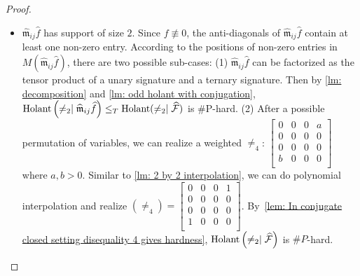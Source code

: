 \begin{proof}
\begin{itemize}
    \item  $\widehat{\mathfrak{m}}_{ij}\widehat f$ has support of size $2$. 
    Since $f\not\equiv0$, the anti-diagonals of $\widehat{\mathfrak{m}}_{ij} \widehat{f}$ contain at least one non-zero entry.
    According to the positions of non-zero entries in $M(\widehat{\mathfrak{m}}_{ij}\widehat f)$, there are two possible sub-cases:
    (1) $\widehat{\mathfrak{m}}_{ij}\widehat f$ can be factorized as the tensor product of a unary signature and a ternary signature.
    Then by \cref{lm: decomposition} and \cref{lm: odd holant with conjugation}, $\operatorname{Holant}\left(\neq_2\mid \widehat{\mathfrak{m}}_{ij}\widehat f\right)\le_T\operatorname{Holant}(\neq_2 \mid \widehat{\mathcal{F}})$ is \#P-hard.
    (2) After a possible permutation of variables, we can realize a weighted $\neq_4$: $ \left[\begin{smallmatrix}
    0 & 0 & 0 & a\\
     0 & 0 & 0 & 0\\
      0 & 0 & 0 & 0\\
       b & 0 & 0 & 0\\
    \end{smallmatrix}\right]$ where $a,b> 0.$
    Similar to \cref{lm: 2 by 2 interpolation}, we can do polynomial interpolation and realize $(\neq_4)=\left[\begin{smallmatrix}
    0 & 0 & 0 & 1\\
     0 & 0 & 0 & 0\\
      0 & 0 & 0 & 0\\
       1 & 0 & 0 & 0\\
    \end{smallmatrix}\right]$.
    By~\cref{lem: In conjugate closed setting disequality 4 gives hardness}, $\operatorname{Holant}\left(\neq_2\mid \widehat{\mathcal{F}}\right)$ is $\#P$-hard.
    

\end{itemize}
\end{proof}

